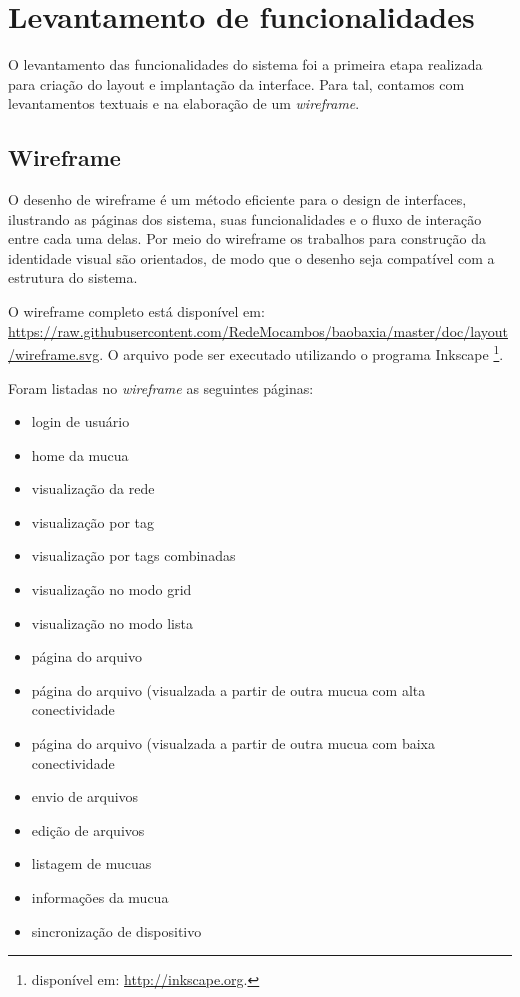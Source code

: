 \section{Levantamento de funcionalidades}
O levantamento das funcionalidades do sistema foi a primeira etapa
realizada para criação do layout e implantação da interface. Para
tal, contamos com levantamentos textuais e na elaboração de um
\emph{wireframe}.

\subsection{Wireframe}
O desenho de wireframe é um método eficiente para o design de
interfaces, ilustrando as páginas dos sistema, suas funcionalidades
e o fluxo de interação entre cada uma delas. Por meio do wireframe
os trabalhos para construção da identidade visual são orientados,
de modo que o desenho seja compatível com a estrutura do sistema.

O wireframe completo está disponível em: \url{https://raw.githubusercontent.com/RedeMocambos/baobaxia/master/doc/layout/wireframe.svg}.
O arquivo pode ser executado utilizando o programa Inkscape \footnote{disponível
  em: \url{http://inkscape.org}.}.

Foram listadas no \emph{wireframe} as seguintes páginas:
\begin{itemize}
\item login de usuário
\item home da mucua
\item visualização da rede
\item visualização por tag
\item visualização por tags combinadas
\item visualização no modo grid
\item visualização no modo lista
\item página do arquivo
\item página do arquivo (visualzada a partir de outra mucua com alta
  conectividade
\item página do arquivo (visualzada a partir de outra mucua com baixa
  conectividade
\item envio de arquivos
\item edição de arquivos
\item listagem de mucuas
\item informações da mucua
\item sincronização de dispositivo
\end{itemize}

